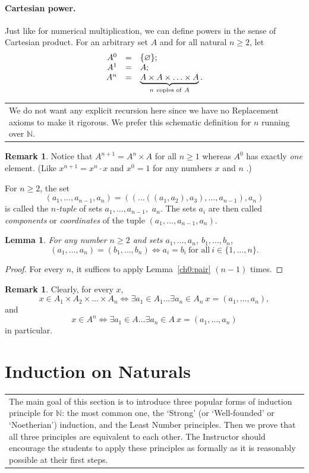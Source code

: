 \documentclass[12pt,notitlepage]{article}
\theoremstyle{plain}
\newtheorem{lemma}[thm]{Lemma}
\theoremstyle{definition}
\newtheorem{rem}[thm]{Remark}
\theoremstyle{plain}
\newcommand{\N}{\mathbb{N}}
\newcommand{\void}{\varnothing}
\newcommand{\1}{\mathbf{1}}
\newcommand{\0}{\mathbf{0}}
\newcommand{\mcomm}[1]{
\medskip\noindent\begin{tabular}{| l}
\parbox{0.99\textwidth}{{\small
#1 }}\end{tabular}
\smallskip}
\begin{document}
\paragraph{Cartesian power.} Just like for numerical multiplication, we can define powers in the sense of Cartesian product. For an arbitrary set $A$ and for all natural $n \geq 2$, let
$$
\begin{array}{rcl}
A^0 &=& \{\void\};\\
A^1 &=& A;\\
A^n &=& \underbrace{A \times A \times \ldots \times A}_{n\ \mbox{\scriptsize copies of}\ A}.
\end{array}
$$
\mcomm{We do not want any explicit recursion here since we have no Replacement axioms to make it rigorous. We prefer this schematic definition for $n$ running over $\N$.}
\begin{rem}\label{ch0:cart_pow}
Notice that $A^{n+1} = A^n \times A$ for all $n \geq 1$ whereas $A^0$ has exactly \emph{one} element. (Like $x^{n+1} = x^n \cdot x$ and $x^0 = 1$ for any numbers $x$ and $n$ .)
\end{rem}

For $n \geq 2$, the set
$$(a_1,\ldots, a_{n-1}, a_{n}) = ((\ldots ((a_1,a_2), a_3), \ldots, a_{n-1}), a_{n})$$
is called the \emph{$n$-tuple} of sets $a_1, \ldots, a_{n-1},$ $a_{n}$. The sets $a_i$ are then called \emph{components} or \emph{coordinates} of the tuple $(a_1,\ldots, a_{n-1}, a_{n})$.
\begin{lemma}\label{L2:l_tuple_id}
For any number $n \geq 2$ and sets $a_1, \ldots, a_{n}$, $b_1, \ldots, b_{n}$,
$$(a_1,\ldots, a_{n}) = (b_1,\ldots, b_{n}) \iff a_i = b_i\ \mbox{for all}\ i \in \{1,\ldots,n\}.$$
\end{lemma}
\begin{proof}
For every $n$, it suffices to apply Lemma~\ref{ch0:pair} $(n-1)$ times.
\end{proof}

\begin{rem}
Clearly, for every $x$,
$$x \in A_1 \times A_2 \times \ldots \times A_n \iff \exists a_1 \in A_1 \ldots \exists a_n \in A_n\ x = (a_1,\ldots,a_n),$$
and
$$x \in A^n \iff \exists a_1 \in A \ldots \exists a_n \in A\ x = (a_1,\ldots,a_n)$$
in particular.
\end{rem}

\newpage
\section{Induction on Naturals}
\mcomm{The main goal of this section is to introduce three popular forms of induction principle for $\N$: the most common one, the `Strong' (or `Well-founded' or `Noetherian') induction, and the Least Number principles. Then we prove that all three principles are equivalent to each other. The Instructor should encourage the students to apply these principles as formally as it is reasonably possible at their first steps.}
\end{document}
